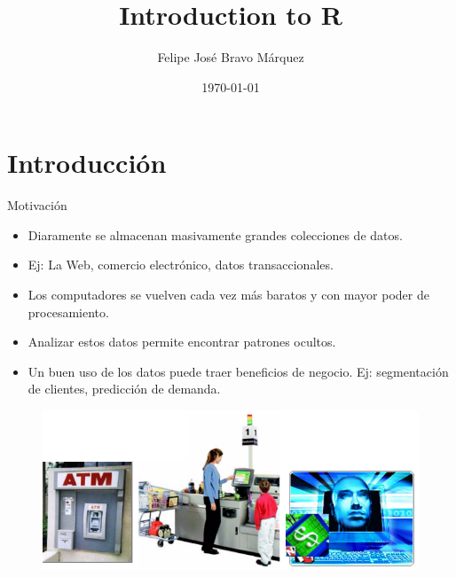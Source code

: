 \documentclass[handout]{beamer}
\title{Introduction to R}
\author[Felipe Bravo Márquez]{\footnotesize
 \textcolor[rgb]{0.00,0.00,1.00}{Felipe José Bravo Márquez}}
\date{ \today }
\begin{document}
\begin{frame}
\titlepage


\end{frame}




\section{Introducción}

\begin{frame}{Motivación}

\scriptsize{
\begin{itemize}
 \item Diaramente se almacenan masivamente grandes colecciones de datos. 
 \item Ej: La Web, comercio electrónico, datos transaccionales.
 \item Los computadores se vuelven cada vez más baratos y con mayor poder de procesamiento.
 \item Analizar estos datos permite encontrar patrones ocultos. 
 \item Un buen uso de los datos puede traer beneficios de negocio. Ej: segmentación de clientes, predicción de demanda.
\end{itemize}

}
\begin{figure}[h!]
	\centering
	\includegraphics[scale=0.5]{pics/supermercado.png}
\end{figure}
 
\end{frame}
\end{document}
